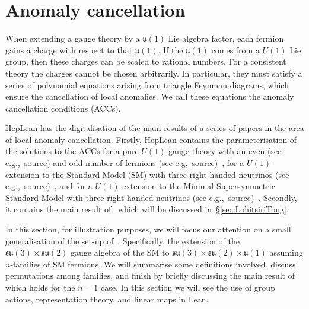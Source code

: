 \documentclass[a4paper, 11pt]{article}
\newcommand{\textLink}[1]{\href{https://github.com/HEPLean/HepLean/blob/1b951994ae3d882242b02d23957ef1ee7fa05f3d/HepLean/#1}{source}}
\begin{document}
\section{Anomaly cancellation}\label{sec:ACCs}

When extending a gauge theory by a $\mathfrak{u}(1)$ Lie algebra factor, each fermion gains a charge with respect to that  $\mathfrak{u}(1)$. If the $\mathfrak{u}(1)$  comes from a $U(1)$ Lie group, then these charges can be scaled to rational numbers. For a consistent theory the charges cannot be chosen arbitrarily. In particular, they must satisfy a series of polynomial equations arising from triangle Feynman diagrams, which ensure the cancellation of local anomalies. We call these equations the anomaly cancellation conditions (ACCs). 

HepLean has the digitalisation of the main results of a series of papers in the area of local anomaly cancellation. Firstly, HepLean contains the parameterisation of the solutions to the ACCs for a pure $U(1)$-gauge theory with an even (see e.g.,~\textLink{AnomalyCancellation/PureU1/Even/Parameterization.lean\#L121}) and odd number of fermions (see e.g,~\textLink{AnomalyCancellation/PureU1/Odd/Parameterization.lean\#L120})~\cite{CDF19, Allanach:2019gwp}, for a $U(1)$-extension to the Standard Model (SM) with three right handed neutrinos (see e.g.,~\textLink{AnomalyCancellation/SMNu/PlusU1/QuadSolToSol.lean\#L143})~\cite{Allanach:2020zna},  and for a $U(1)$-extension to the Minimal Supersymmetric Standard Model with three right handed neutrinos (see e.g.,~\textLink{AnomalyCancellation/MSSMNu/OrthogY3B3/ToSols.lean\#L450})~\cite{Allanach:2021yjy}. Secondly, it contains the main result of~\cite{LT19} which will be discussed in~\S\ref{sec:LohitsiriTong}. 

In this section, for illustration purposes, we will focus our attention on a small generalisation of the set-up of~\cite{LT19}. Specifically,  the
extension of the  $\mathfrak{su}(3)\times \mathfrak{su}(2)$ gauge algebra of the SM to $\mathfrak{su}(3)\times \mathfrak{su}(2) \times \mathfrak{u}(1)$ assuming $n$-families of SM fermions.
 We will summarise some definitions involved, discuss permutations among families, and finish by briefly discussing the main result of~\cite{LT19} which holds for the $n=1$ case. In this section we will see the use of group actions, representation theory, and linear maps in Lean. 
\end{document}
